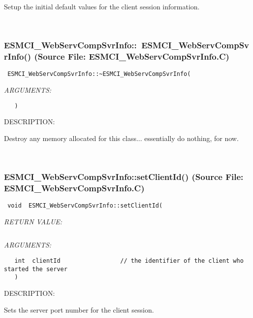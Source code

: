       Setup the initial default values for the client session information.
   
 
\mbox{}\hrulefill\
 
\subsubsection{ESMCI\_WebServCompSvrInfo::~ESMCI\_WebServCompSvrInfo() (Source File: ESMCI\_WebServCompSvrInfo.C)}


  
\begin{verbatim} ESMCI_WebServCompSvrInfo::~ESMCI_WebServCompSvrInfo(\end{verbatim}{\em ARGUMENTS:}
\begin{verbatim}   )\end{verbatim}
{\sf DESCRIPTION:\\ }


      Destroy any memory allocated for this class... essentially do nothing,
      for now.
   
 
\mbox{}\hrulefill\
 
\subsubsection{ESMCI\_WebServCompSvrInfo::setClientId() (Source File: ESMCI\_WebServCompSvrInfo.C)}


  
\begin{verbatim} void  ESMCI_WebServCompSvrInfo::setClientId(\end{verbatim}{\em RETURN VALUE:}
\begin{verbatim} \end{verbatim}{\em ARGUMENTS:}
\begin{verbatim}   int  clientId                 // the identifier of the client who started the server
   )\end{verbatim}
{\sf DESCRIPTION:\\ }


      Sets the server port number for the client session.
   
 
\mbox{}\hrulefill\
 
